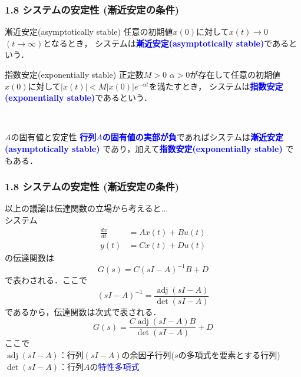 \documentclass[10pt]{beamer}
\begin{document}
\begin{frame}[t]
\frametitle{1.8 システムの安定性 (漸近安定の条件)}
\begin{block}{漸近安定(asymptotically stable)}
任意の初期値$x(0)$に対して$x(t) \rightarrow 0$ $(t \rightarrow \infty)$となるとき，
システムは\textcolor{blue}{\bf 漸近安定(asymptotically stable)}であるという．
\end{block}
\begin{block}{指数安定(exponentially stable)}
正定数$M>0$ $\alpha>0$が存在して任意の初期値$x(0)$に対して$|x(t)| < M |x(0)| e^{-\alpha t}$を満たすとき，
システムは\textcolor{blue}{\bf 指数安定(exponentially stable)}であるという．
\end{block}
\ \\

\begin{block}{$A$の固有値と安定性}
\textcolor{blue}{\bf 行列$A$の固有値の実部が負}であればシステムは\textcolor{blue}{\bf 漸近安定(asymptotically stable)} であり，加えて\textcolor{blue}{\bf 指数安定(exponentially stable)} でもある．
\end{block}

\end{frame}


\begin{frame}[t]
\frametitle{1.8 システムの安定性 (漸近安定の条件)}
以上の議論は伝達関数の立場から考えると...\\
システム
\begin{align}
   \frac{dx}{dt} &= A x(t) + B u(t)  \\
   y(t) &= C x(t) + D u(t) 
\end{align}
の伝達関数は
\begin{equation}
 G(s) = C ( sI - A )^{-1} B + D
\end{equation}
で表わされる．ここで
\begin{equation}
 (s I - A)^{-1}
  = \frac{\operatorname{adj} (s I - A)}{\operatorname{det} (s I - A )}
\end{equation}
であるから，伝達関数は次式で表される．
\begin{equation}
 G(s)
  = \frac{C \operatorname{adj} (s I - A)B}{\operatorname{det} (s I - A )}
  + D
\end{equation}
ここで\\
$\operatorname{adj} (s I - A)$：行列$(s I - A)$の余因子行列($s$の多項式を要素とする行列)\\
$\operatorname{det} (s I - A)$：行列$A$の\textcolor{blue}{特性多項式}
\end{frame}
\end{document}
